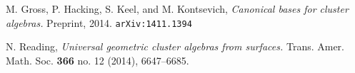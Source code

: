 \documentclass{amsart}
\theoremstyle{definition}
\theoremstyle{remark}
\numberwithin{equation}{section}
\newcommand{\0}{{\mathbf{0}}}
\begin{document}
\begin{thebibliography}{27}
M. Gross, P. Hacking, S. Keel, and M. Kontsevich,
\textit{Canonical bases for cluster algebras.}
Preprint, 2014. \texttt{arXiv:1411.1394}

N. Reading,
\textit{Universal geometric cluster algebras from surfaces. }
Trans. Amer. Math. Soc. \textbf{366} no. 12 (2014), 6647--6685.

\end{thebibliography}
\end{document}
